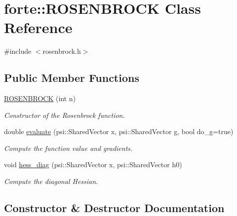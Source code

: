 \hypertarget{classforte_1_1_r_o_s_e_n_b_r_o_c_k}{}\section{forte\+:\+:R\+O\+S\+E\+N\+B\+R\+O\+CK Class Reference}
\label{classforte_1_1_r_o_s_e_n_b_r_o_c_k}


{\ttfamily \#include $<$rosenbrock.\+h$>$}

\subsection*{Public Member Functions}
\begin{DoxyCompactItemize}
\item 
\mbox{\hyperlink{classforte_1_1_r_o_s_e_n_b_r_o_c_k_a99d9bcc9e0aafcc81061e765502af3a7}{R\+O\+S\+E\+N\+B\+R\+O\+CK}} (int n)
\begin{DoxyCompactList}\small\item\em Constructor of the Rosenbrock function. \end{DoxyCompactList}\item 
double \mbox{\hyperlink{classforte_1_1_r_o_s_e_n_b_r_o_c_k_a7b88dafdddd2cb15f10bd7dad7d83f37}{evaluate}} (psi\+::\+Shared\+Vector x, psi\+::\+Shared\+Vector g, bool do\+\_\+g=true)
\begin{DoxyCompactList}\small\item\em Compute the function value and gradients. \end{DoxyCompactList}\item 
void \mbox{\hyperlink{classforte_1_1_r_o_s_e_n_b_r_o_c_k_a537d1edd545f8ada23022f77f39ae856}{hess\+\_\+diag}} (psi\+::\+Shared\+Vector x, psi\+::\+Shared\+Vector h0)
\begin{DoxyCompactList}\small\item\em Compute the diagonal Hessian. \end{DoxyCompactList}\end{DoxyCompactItemize}


\subsection{Constructor \& Destructor Documentation}
\mbox{\label{classforte_1_1_r_o_s_e_n_b_r_o_c_k_a99d9bcc9e0aafcc81061e765502af3a7}} 
